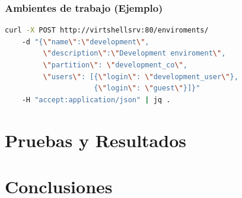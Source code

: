 \documentclass[xcolor=dvipsnames]{beamer} %
\begin{document}
\begin{frame}[fragile]
\frametitle{Ambientes de trabajo (Ejemplo)}
\begin{lstlisting}[language=Bash,basicstyle=\ttfamily\scriptsize,keywordstyle=\color{blue}]
curl -X POST http://virtshellsrv:80/enviroments/ 
    -d "{\"name\":\"development\",
         \"description\":\"Development enviroment\", 
         \"partition\": \"development_co\", 
         \"users\": [{\"login\": \"development_user\"}, 
                     {\"login\": \"guest\"}]}" 
    -H "accept:application/json" | jq .
\end{lstlisting}
\end{frame}








\section{Pruebas y Resultados}


\section{Conclusiones}

\end{document}
